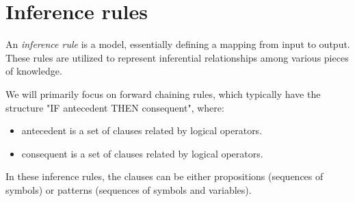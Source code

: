\documentclass[12pt, a4paper]{report}
\begin{document}
    \section{Inference rules}
    \begin{definition}
        An \emph{inference rule} is a model, essentially defining a mapping from input to output. 
        These rules are utilized to represent inferential relationships among various pieces of knowledge.
    \end{definition}
    We will primarily focus on forward chaining rules, which typically have the structure "IF antecedent THEN consequent", where: 
    \begin{itemize}
        \item antecedent is a set of clauses related by logical operators.
        \item consequent is a set of clauses related by logical operators.
    \end{itemize}
    In these inference rules, the clauses can be either propositions (sequences of symbols) or patterns (sequences of symbols and variables).
\end{document}
